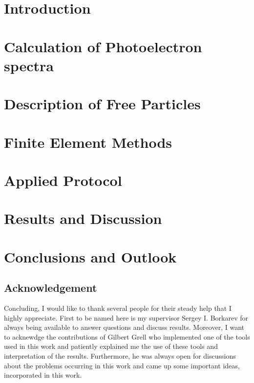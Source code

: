 \documentclass[12pt,a4paper,oneside]{book}
\begin{document}
\chapter{Introduction} %


\chapter{Calculation of Photoelectron spectra}


\chapter{Description of Free Particles} 


\chapter{Finite Element Methods}


\chapter{Applied Protocol}


\chapter{Results and Discussion}


\chapter{Conclusions and Outlook}


\newpage
\section*{Acknowledgement}
Concluding, I would like to thank several people for their steady help that I highly appreciate.
First to be named here is my supervisor Sergey I. Borkarev for always being available to answer questions and discuss results.
Moreover, I want to acknewdge the contributions of Gilbert Grell who implemented one of the tools used in this work and patiently explained me the use of these tools and interpretation of the results.
Furthermore, he was always open for discussions about the problems occurring in this work and came up some important ideas, incorporated in this work.
\end{document}
